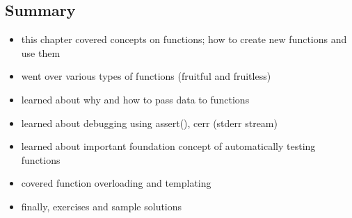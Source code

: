 \documentclass[11pt]{article}
\makeatletter
\providecommand{\tightlist}{%
      \setlength{\itemsep}{0pt}\setlength{\parskip}{0pt}}
\newcommand{\boxspacing}{\kern\kvtcb@left@rule\kern\kvtcb@boxsep}
\newcommand{\prompt}[4]{
        {\ttfamily\llap{{\color{#2}[#3]:\hspace{3pt}#4}}\vspace{-\baselineskip}}
    }
\makeatother
\begin{document}
    \hypertarget{summary}{%
\subsection{Summary}\label{summary}}

\begin{itemize}
\tightlist
\item
  this chapter covered concepts on functions; how to create new
  functions and use them
\item
  went over various types of functions (fruitful and fruitless)
\item
  learned about why and how to pass data to functions
\item
  learned about debugging using assert(), cerr (stderr stream)
\item
  learned about important foundation concept of automatically testing
  functions
\item
  covered function overloading and templating
\item
  finally, exercises and sample solutions
\end{itemize}

    \begin{tcolorbox}[breakable, size=fbox, boxrule=1pt, pad at break*=1mm,colback=cellbackground, colframe=cellborder]
\prompt{In}{incolor}{ }{\boxspacing}
\begin{Verbatim}[commandchars=\\\{\}]

\end{Verbatim}
\end{tcolorbox}


    
    
    
\end{document}
